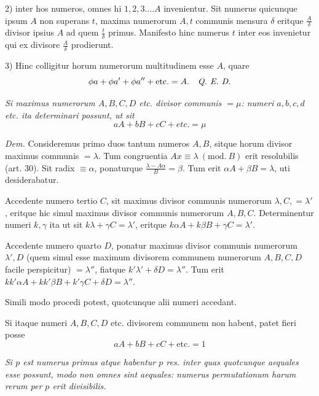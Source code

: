 2) inter hos numeros, omnes hi $1,2,3....A$ invenientur. Sit numerus quicunque ipsum $A$ non superans $t$, maxima numerorum $A,t$ communis mensura $\delta$ eritque $\frac{A}{\delta}$ divisor ipsius $A$ ad quem $\frac{t}{\delta}$ primus. Manifesto hinc numerus $t$ inter eos invenietur qui ex divisore $\frac{A}{\delta}$ prodierunt.

3) Hinc colligitur horum numerorum multitudinem esse $A$, quare
\[\phi a+\phi a'+\phi a''+\mathrm{etc.}=A.\quad\emph{Q. E. D.}\]

\emph{Si maximus numerorum $A,B,C,D$ etc. divisor communis $=\mu$: numeri $a,b,c,d$ etc. ita determinari possunt, ut sit}
\[aA+bB+cC+\textit{etc.}=\mu\]

\emph{Dem.} Consideremus primo duos tantum numeros $A,B$, sitque horum divisor maximus communis $=\lambda$. Tum congruentia $Ax\equiv\lambda\ (\mathrm{mod.}\ B)$ erit resolubilis (art. 30). Sit radix $\equiv\alpha$, ponaturque $\frac{\lambda-A\alpha}{B}=\beta$. Tum erit $\alpha A+\beta B=\lambda$, uti desiderabatur.

Accedente numero tertio $C$, sit maximus divisor communis numerorum $\lambda,C,=\lambda'$, eritque hic simul maximus divisor communis numerorum $A,B,C$. Determinentur numeri $k,\gamma$ ita ut sit $k\lambda+\gamma C=\lambda'$, eritque $k\alpha A+k\beta B+\gamma C=\lambda'$.

Accedente numero quarto $D$, ponatur maximus divisor communis numerorum $\lambda',D$ (quem simul esse maximum divisorem communem numerorum $A,B,C,D$ facile perspicitur) $=\lambda''$, fiatque $k'\lambda'+\delta D=\lambda''$. Tum erit $kk'\alpha A+kk'\beta B+k'\gamma C+\delta D=\lambda''$.

Simili modo procedi potest, quotcunque alii numeri accedant.

Si itaque numeri $A,B,C,D$ etc. divisorem communem non habent, patet fieri posse
\[aA+bB+cC+\mathrm{etc.}=1\]

\emph{Si $p$ est numerus primus atque habentur $p$ res. inter quas quotcunque aequales esse possunt, modo non omnes sint aequales: numerus permutationum harum rerum per $p$ erit divisibilis.}


